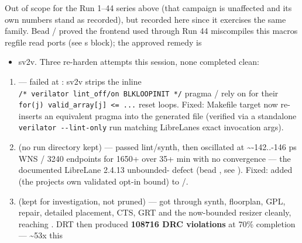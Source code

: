 \begin{record}

Out of scope for the Run 1--44 series above (that campaign is unaffected
and its own numbers stand as recorded), but recorded here since it
exercises the same  family. Bead
/ proved the  frontend used
through Run 44 miscompiles this macro\textquotesingle s regfile read
ports (see \textquotesingle s \bad{} block); the approved
remedy is 

\begin{itemize}
\tightlist
\item
  sv2v. Three re-harden attempts this session, none completed clean:
\end{itemize}

\begin{enumerate}
\def\labelenumi{\arabic{enumi}.}
\tightlist
\item
   --- failed at
  : sv2v strips the inline
  \texttt{/\allowbreak{}*\ verilator\ lint\_\allowbreak{}off/\allowbreak{}on\ BLKLOOPINIT\ */\allowbreak{}}
  pragma / rely on for their
  \texttt{for(j)\ valid\_\allowbreak{}array[j]\ <=\allowbreak{}\ .\allowbreak{}.\allowbreak{}.\allowbreak{}}
  reset loops. Fixed:  Makefile target now
  re-inserts an equivalent pragma into the generated file (verified via
  a standalone
  \texttt{verilator\ -\allowbreak{}-\allowbreak{}lint-\allowbreak{}only}
  run matching LibreLane\textquotesingle s exact invocation args).
\item
  (no run directory kept) --- passed lint/\allowbreak{}synth, then
   oscillated at
  \textasciitilde-142..-146 ps WNS / 3240 endpoints for 1650+
   over 35+ min with no convergence --- the documented
  LibreLane 2.4.13 unbounded- defect (bead
  , see ). Fixed: added
   (the project\textquotesingle s
  own validated opt-in bound) to
  /.
\item
   (kept for investigation, not pruned)
  --- got through synth, floorplan, GPL, repair, detailed placement,
  CTS, GRT and the now-bounded resizer cleanly, reaching
  . DRT then produced \textbf{108716 DRC
  violations} at 70\% completion --- \textasciitilde53x this

\end{enumerate}
\end{record}

